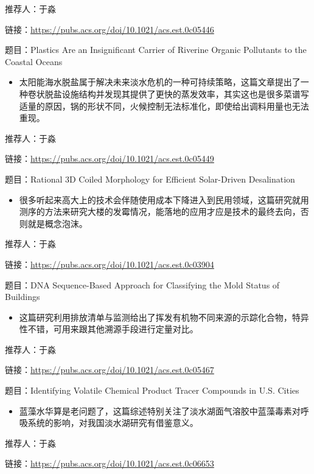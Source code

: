 \documentclass[
]{book}
\providecommand{\tightlist}{%
  \setlength{\itemsep}{0pt}\setlength{\parskip}{0pt}}
\begin{document}
推荐人：于淼

链接：\url{https://pubs.acs.org/doi/10.1021/acs.est.0c05446}

题目：Plastics Are an Insignificant Carrier of Riverine Organic Pollutants to the Coastal Oceans

\begin{itemize}
\tightlist
\item
  太阳能海水脱盐属于解决未来淡水危机的一种可持续策略，这篇文章提出了一种卷状脱盐设施结构并发现其提供了更快的蒸发效率，其实这也是很多菜谱写适量的原因，锅的形状不同，火候控制无法标准化，即使给出调料用量也无法重现。
\end{itemize}

推荐人：于淼

链接：\url{https://pubs.acs.org/doi/10.1021/acs.est.0c05449}

题目：Rational 3D Coiled Morphology for Efficient Solar-Driven Desalination

\begin{itemize}
\tightlist
\item
  很多听起来高大上的技术会伴随使用成本下降进入到民用领域，这篇研究就用测序的方法来研究大楼的发霉情况，能落地的应用才应是技术的最终去向，否则就是概念泡沫。
\end{itemize}

推荐人：于淼

链接：\url{https://pubs.acs.org/doi/10.1021/acs.est.0c03904}

题目：DNA Sequence-Based Approach for Classifying the Mold Status of Buildings

\begin{itemize}
\tightlist
\item
  这篇研究利用排放清单与监测给出了挥发有机物不同来源的示踪化合物，特异性不错，可用来跟其他溯源手段进行定量对比。
\end{itemize}

推荐人：于淼

链接：\url{https://pubs.acs.org/doi/10.1021/acs.est.0c05467}

题目：Identifying Volatile Chemical Product Tracer Compounds in U.S. Cities

\begin{itemize}
\tightlist
\item
  蓝藻水华算是老问题了，这篇综述特别关注了淡水湖面气溶胶中蓝藻毒素对呼吸系统的影响，对我国淡水湖研究有借鉴意义。
\end{itemize}

推荐人：于淼

链接：\url{https://pubs.acs.org/doi/10.1021/acs.est.0c06653}
\end{document}
